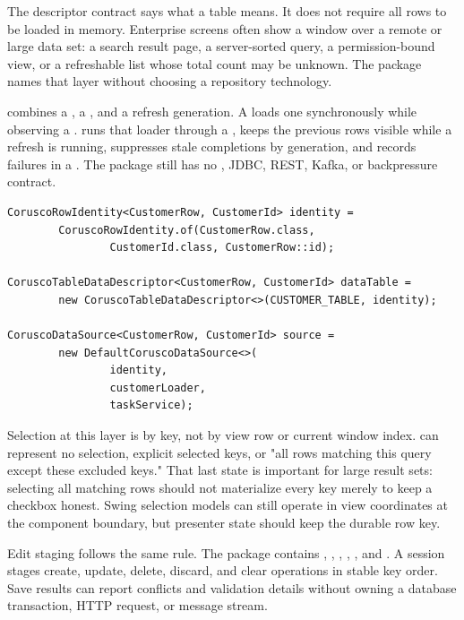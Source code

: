 The descriptor contract says what a table means. It does not require all rows
to be loaded in memory. Enterprise screens often show a window over a remote or
large data set: a search result page, a server-sorted query, a permission-bound
view, or a refreshable list whose total count may be unknown. The
 package names that layer without choosing a
repository technology.

 combines a , a
, and a refresh generation. A 
loads one  synchronously while observing a
.  runs that loader
through a , keeps the previous rows visible while a refresh is
running, suppresses stale completions by generation, and records failures in a
. The package still has no , JDBC, REST,
Kafka, or backpressure contract.

\begin{lstlisting}[caption={Descriptor-backed table data without committing to a backend.}]
CoruscoRowIdentity<CustomerRow, CustomerId> identity =
        CoruscoRowIdentity.of(CustomerRow.class,
                CustomerId.class, CustomerRow::id);

CoruscoTableDataDescriptor<CustomerRow, CustomerId> dataTable =
        new CoruscoTableDataDescriptor<>(CUSTOMER_TABLE, identity);

CoruscoDataSource<CustomerRow, CustomerId> source =
        new DefaultCoruscoDataSource<>(
                identity,
                customerLoader,
                taskService);
\end{lstlisting}

Selection at this layer is by key, not by view row or current window index.
 can represent no selection, explicit selected keys,
or "all rows matching this query except these excluded keys." That last state
is important for large result sets: selecting all matching rows should not
materialize every key merely to keep a checkbox honest. Swing selection models
can still operate in view coordinates at the component boundary, but presenter
state should keep the durable row key.

Edit staging follows the same rule. The
 package contains
, , ,
, , and
. A session stages create, update, delete, discard, and
clear operations in stable key order. Save results can report conflicts and
 validation details without owning a database transaction,
HTTP request, or message stream.

